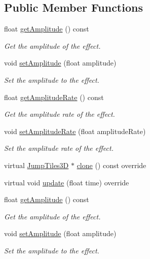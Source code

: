 \subsection*{Public Member Functions}
\begin{DoxyCompactItemize}
\item 
float \hyperlink{classJumpTiles3D_a3eb2d1214dcaa28f1ea5c35ad153cb47}{get\+Amplitude} () const
\begin{DoxyCompactList}\small\item\em Get the amplitude of the effect. \end{DoxyCompactList}\item 
void \hyperlink{classJumpTiles3D_ad8ce4418210315eddafb7d3ed808c456}{set\+Amplitude} (float amplitude)
\begin{DoxyCompactList}\small\item\em Set the amplitude to the effect. \end{DoxyCompactList}\item 
float \hyperlink{classJumpTiles3D_aadb1cb0d358f196db393dd09caa1bea5}{get\+Amplitude\+Rate} () const
\begin{DoxyCompactList}\small\item\em Get the amplitude rate of the effect. \end{DoxyCompactList}\item 
void \hyperlink{classJumpTiles3D_a88c71fba09dca459111b8fc0dd03d53f}{set\+Amplitude\+Rate} (float amplitude\+Rate)
\begin{DoxyCompactList}\small\item\em Set the amplitude rate of the effect. \end{DoxyCompactList}\item 
virtual \hyperlink{classJumpTiles3D}{Jump\+Tiles3D} $\ast$ \hyperlink{classJumpTiles3D_a65989f533d25fd290a6997f63d14072a}{clone} () const override
\item 
virtual void \hyperlink{classJumpTiles3D_a88323f8656870818d0d517392ce70e52}{update} (float time) override
\item 
float \hyperlink{classJumpTiles3D_a3eb2d1214dcaa28f1ea5c35ad153cb47}{get\+Amplitude} () const
\begin{DoxyCompactList}\small\item\em Get the amplitude of the effect. \end{DoxyCompactList}\item 
void \hyperlink{classJumpTiles3D_ad8ce4418210315eddafb7d3ed808c456}{set\+Amplitude} (float amplitude)
\begin{DoxyCompactList}\small\item\em Set the amplitude to the effect. \end{DoxyCompactList}\item 

\end{DoxyCompactItemize}
